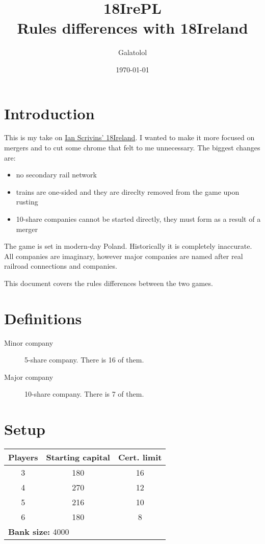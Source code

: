 \documentclass[10pt,a4paper,twocolumn]{article}
\title{18IrePL\\ \large{Rules differences with 18Ireland}}
\author{Galatolol}
\date{\today}
\begin{document}
\maketitle

\section{Introduction}
This is my take on \href{https://boardgamegeek.com/boardgame/196217/18ireland}{Ian Scrivins' 18Ireland}. I wanted to make it more focused on mergers and to cut some chrome that felt to me unnecessary. The biggest changes are: 
\begin{itemize}
\item no secondary rail network
\item trains are one-sided and they are direclty removed from the game upon rusting
\item 10-share companies cannot be started directly, they must form as a result of a merger
\end{itemize}

The game is set in modern-day Poland. Historically it is completely inaccurate. All companies are imaginary, however major companies are named after real railroad connections and companies.

This document covers the rules differences between the two games.



\section{Definitions}
\begin{description}
	\item [Minor company] 5-share company. There is 16 of them.
	\item [Major company] 10-share company. There is 7 of them.
\end{description}

\section{Setup}

\begin{center}
  \begin{tabular}{ | c | c | c | }
    \hline
    \textbf{Players} & \textbf{Starting capital} & \textbf{Cert. limit} \\ \hline
    3 & 180 & 16 \\ \hline
    4 & 270 & 12 \\ \hline
    5 & 216 & 10 \\ \hline
    6 & 180 & 8 \\ 
    \hline
      \multicolumn{3}{|l|}{\textbf{Bank size:} 4000} \\
 	\hline

  \end{tabular}
\end{center}
\end{document}
